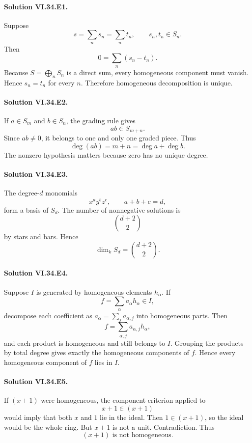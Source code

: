 
\paragraph{Solution VI.34.E1.}
Suppose
\[
s=\sum_n s_n=\sum_n t_n,\qquad s_n,t_n\in S_n.
\]
Then
\[
0=\sum_n(s_n-t_n).
\]
Because \(S=\bigoplus_nS_n\) is a direct sum, every homogeneous component must vanish. Hence
\(s_n=t_n\) for every \(n\). Therefore homogeneous decomposition is unique.

\paragraph{Solution VI.34.E2.}
If \(a\in S_m\) and \(b\in S_n\), the grading rule gives
\[
ab\in S_{m+n}.
\]
Since \(ab\ne0\), it belongs to one and only one graded piece. Thus
\[
\boxed{\deg(ab)=m+n=\deg a+\deg b}.
\]
The nonzero hypothesis matters because zero has no unique degree.

\paragraph{Solution VI.34.E3.}
The degree-\(d\) monomials
\[
x^ay^bz^c,\qquad a+b+c=d,
\]
form a basis of \(S_d\). The number of nonnegative solutions is
\[
\binom{d+2}{2}
\]
by stars and bars. Hence
\[
\boxed{\dim_kS_d=\binom{d+2}{2}}.
\]

\paragraph{Solution VI.34.E4.}
Suppose \(I\) is generated by homogeneous elements \(h_\alpha\). If
\[
f=\sum_\alpha a_\alpha h_\alpha\in I,
\]
decompose each coefficient as \(a_\alpha=\sum_j a_{\alpha,j}\) into homogeneous parts. Then
\[
f=\sum_{\alpha,j}a_{\alpha,j}h_\alpha,
\]
and each product is homogeneous and still belongs to \(I\). Grouping the products by total degree gives exactly
the homogeneous components of \(f\). Hence every homogeneous component of \(f\) lies in \(I\).

\paragraph{Solution VI.34.E5.}
If \((x+1)\) were homogeneous, the component criterion applied to
\[
x+1\in(x+1)
\]
would imply that both \(x\) and \(1\) lie in the ideal. Then \(1\in(x+1)\), so the ideal would be the whole ring.
But \(x+1\) is not a unit. Contradiction. Thus
\[
\boxed{(x+1)\text{ is not homogeneous}}.
\]

